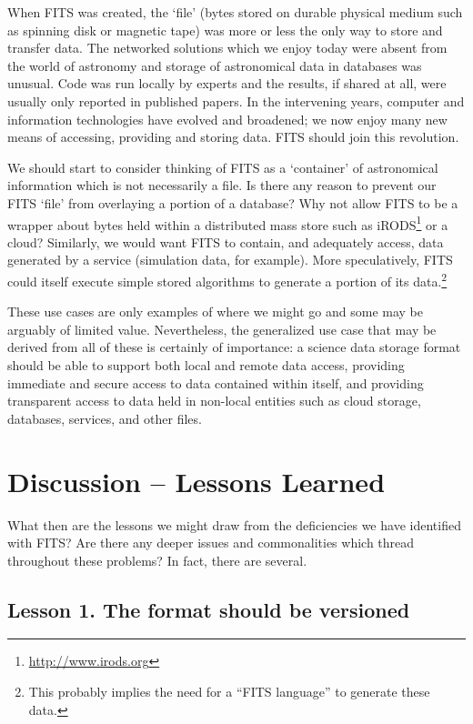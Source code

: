 \documentclass[final,authoryear,5p,times,twocolumn]{elsarticle}
\begin{document}
{{When FITS was created, the `file' (bytes stored on durable physical
medium such as spinning disk or magnetic tape) was more or less the
only way to store and transfer data. The networked solutions which we
enjoy today were absent from the world of astronomy and storage of
astronomical data in databases was unusual. Code was run locally by
experts and the results, if shared at all, were usually only reported
in published papers. In the intervening years, computer and
information technologies have evolved and broadened; we now enjoy many
new means of accessing, providing and storing data. FITS should join
this revolution.


We should start to consider thinking of FITS as a `container' of
astronomical information which is not necessarily a file. Is there
any reason to prevent our FITS `file' from overlaying a portion of a
database? Why not allow FITS to be a wrapper about bytes held within a
distributed mass store such as
iRODS\footnote{\url{http://www.irods.org}} \citep[see e.g.,][]{2007AGUFMIN13B1214R}
or a cloud?  Similarly, we would
want FITS to contain, and adequately access, data generated by a
service (simulation data, for example). More speculatively, FITS could
itself execute simple stored algorithms to generate a portion of its
data.\footnote{This probably implies the need for a ``FITS language''
to generate these data.}


These use cases are only examples of where we might go and some may be
arguably of limited value. Nevertheless, the generalized use case that
may be derived from all of these is certainly of importance:
a science data storage format should be able to support both local
and remote data access, providing immediate and secure access to data
contained within itself, and providing transparent access to data held
in non-local entities such as cloud storage, databases, services, and
other files.


\section{Discussion -- Lessons Learned}

What then are the lessons we might draw from the deficiencies
we have identified with FITS? Are there any deeper issues and
commonalities which thread throughout these problems? In fact,
there are several.


\subsection{Lesson 1. The format should be versioned}

}}
\end{document}
